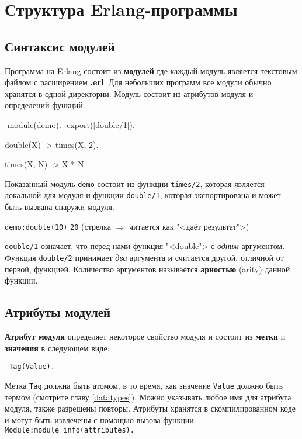 \chapter{Структура Erlang-программы}

\section{Синтаксис модулей}

Программа на Erlang состоит из \textbf{модулей} где каждый модуль является текстовым
файлом с расширением \textbf{.erl}. Для небольших программ все модули обычно хранятся
в одной директории. Модуль состоит из атрибутов модуля и определений функций.

\begin{erlang}
-module(demo).
-export([double/1]).

double(X) -> times(X, 2).

times(X, N) -> X * N.
\end{erlang}

Показанный модуль \texttt{demo} состоит из функции \texttt{times/2}, которая является
локальной для модуля и функции \texttt{double/1}, которая экспортирована и может быть
вызвана снаружи модуля.

\texttt{demo:double(10)} \resultingin \texttt{20}\hfill
(стрелка $\Rightarrow$ читается как "<даёт результат">)

\texttt{double/1} означает, что перед нами функция "<double"> с \textit{одним}
аргументом. Функция \texttt{double/2} принимает \textit{два} аргумента и считается
другой,  отличной от первой, функцией. Количество аргументов называется
\textbf{арностью} (arity) данной функции.



\section{Атрибуты модулей}
\textbf{Атрибут модуля} определяет некоторое свойство модуля и состоит из 
\textbf{метки} и \textbf{значения} в следующем виде:

\texttt{-Tag(Value).}

Метка \texttt{Tag} должна быть атомом, в то время, как значение \texttt{Value} 
должно быть термом (смотрите главу \ref{datatypes}). Можно указывать любое имя
для атрибута модуля, также разрешены повторы. Атрибуты хранятся в скомпилированном
коде и могут быть извлечены с помощью вызова функции
\texttt{Module:module\_info(attributes).}

